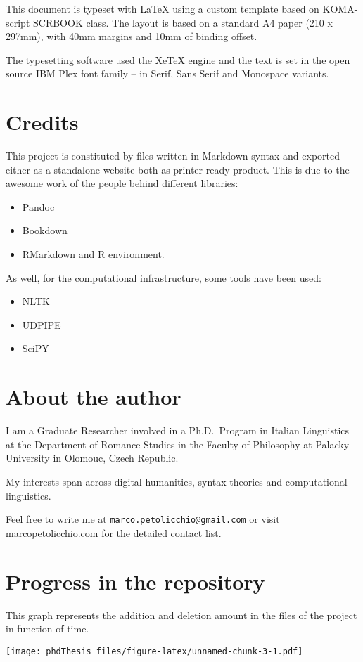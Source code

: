 \documentclass[a4paper,twoside,12pt,chapterprefix=false,bibliography=totocnumbered,listof=flat]{scrbook}
\providecommand{\tightlist}{%
  \setlength{\itemsep}{0pt}\setlength{\parskip}{0pt}}
\begin{document}
This document is typeset with LaTeX using a custom template based on
KOMA-script SCRBOOK class. The layout is based on a standard A4 paper
(210 x 297mm), with 40mm margins and 10mm of binding offset.

The typesetting software used the XeTeX engine and the text is set in
the open source IBM Plex font family -- in Serif, Sans Serif and
Monospace variants.

\section{Credits}\label{credits}

This project is constituted by files written in Markdown syntax and
exported either as a standalone website both as printer-ready product.
This is due to the awesome work of the people behind different
libraries:

\begin{itemize}
\tightlist
\item
  \href{https://bookdown.org}{Pandoc}
\item
  \href{https://bookdown.org}{Bookdown}
\item
  \href{https://bookdown.org}{RMarkdown} and
  \href{https://bookdown.org}{R} environment.
\end{itemize}

As well, for the computational infrastructure, some tools have been
used:

\begin{itemize}
\tightlist
\item
  \href{https://bookdown.org}{NLTK}
\item
  UDPIPE
\item
  SciPY
\end{itemize}

\section{About the author}\label{about-the-author}

I am a Graduate Researcher involved in a Ph.D.~Program in Italian
Linguistics at the Department of Romance Studies in the Faculty of
Philosophy at Palacky University in Olomouc, Czech Republic.

My interests span across digital humanities, syntax theories and
computational linguistics.

Feel free to write me at
\href{mailto:marco.petolicchio@gmail.com}{\nolinkurl{marco.petolicchio@gmail.com}}
or visit \href{http://marcopetolicchio.com}{marcopetolicchio.com} for
the detailed contact list.

\section{Progress in the repository}\label{progress-in-the-repository}

This graph represents the addition and deletion amount in the files of
the project in function of time.

\texttt{[image: phdThesis\_files/figure-latex/unnamed-chunk-3-1.pdf]}


\end{document}
